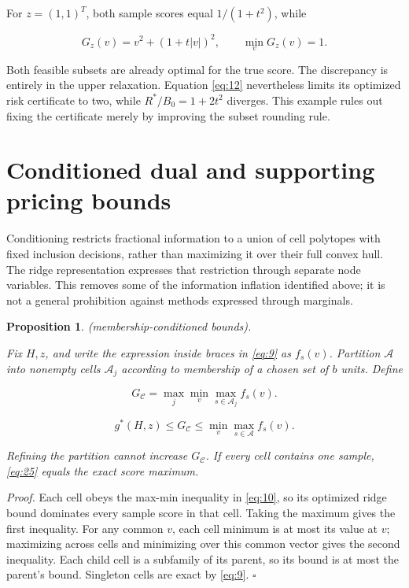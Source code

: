 \documentclass[11pt]{article}
\newtheorem{proposition}[theorem]{Proposition}
\begin{document}
For \(z=(1,1)^T\), both sample scores equal \(1/(1+t^2)\), while

\begin{equation}\label{eq:17}
G_z(v)=v^2+(1+t|v|)^2,
\qquad \min_vG_z(v)=1. 
\end{equation}

Both feasible subsets are already optimal for the true score. The
discrepancy is entirely in the upper relaxation. Equation \eqref{eq:12}
nevertheless limits its optimized risk certificate to two, while
\(R^*/B_0=1+2t^2\) diverges. This example rules out fixing the
certificate merely by improving the subset rounding rule.

\section{Conditioned dual and supporting pricing
bounds}\label{conditioned-dual-and-supporting-pricing-bounds}

Conditioning restricts fractional information to a union of cell
polytopes with fixed inclusion decisions, rather than maximizing it over
their full convex hull. The ridge representation expresses that
restriction through separate node variables. This removes some of the
information inflation identified above; it is not a general prohibition
against methods expressed through marginals.

\begin{proposition}\label{th:5} (membership-conditioned bounds).

Fix \(H,z\), and write the expression inside braces in \eqref{eq:9} as
\(f_s(v)\). Partition \(\mathcal A\) into nonempty cells
\(\mathcal A_j\) according to membership of a chosen set of \(b\) units.
Define

\begin{equation}\label{eq:25}
G_{\mathcal C}=\max_j\min_v\max_{s\in\mathcal A_j}f_s(v). 
\end{equation}

\begin{equation}\label{eq:26}
g^*(H,z)\le G_{\mathcal C}\le\min_v\max_{s\in\mathcal A}f_s(v). 
\end{equation}

Refining the partition cannot increase \(G_{\mathcal C}\). If every cell
contains one sample, \eqref{eq:25} equals the exact score maximum.

\end{proposition}

\emph{Proof.} Each cell obeys the max-min inequality in \eqref{eq:10},
so its optimized ridge bound dominates every sample score in that cell.
Taking the maximum gives the first inequality. For any common \(v\),
each cell minimum is at most its value at \(v\); maximizing across cells
and minimizing over this common vector gives the second inequality. Each
child cell is a subfamily of its parent, so its bound is at most the
parent's bound. Singleton cells are exact by \eqref{eq:9}. \(\square\)
\end{document}
